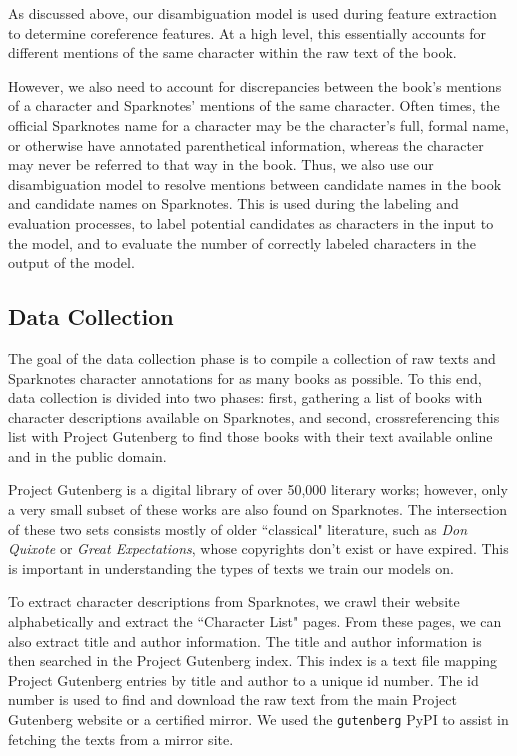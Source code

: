 \documentclass[12pt]{article}
\begin{document}
        As discussed above, our disambiguation model is used during feature extraction to determine coreference
        features.  At a high level, this essentially accounts for different mentions of the same character within the
        raw text of the book.

        However, we also need to account for discrepancies between the book's mentions of a character and Sparknotes'
        mentions of the same character.  Often times, the official Sparknotes name for a character may be the character's
        full, formal name, or otherwise have annotated parenthetical information, whereas the character may never be
        referred to that way in the book.  Thus, we also use our disambiguation model to resolve mentions between candidate
        names in the book and candidate names on Sparknotes.  This is used during the labeling and evaluation processes,
        to label potential candidates as characters in the input to the model, and to evaluate the number of correctly
        labeled characters in the output of the model.


    \subsection{Data Collection}
        The goal of the data collection phase is to compile a collection of raw texts and Sparknotes
        character annotations for as many books as possible.  To this end, data collection is divided into
        two phases: first, gathering a list of books with character descriptions available on Sparknotes,
        and second, crossreferencing this list with Project Gutenberg to find those books with their text
        available online and in the public domain.

        Project Gutenberg is a digital library of over 50,000 literary works; however, only a very small
        subset of these works are also found on Sparknotes.  The intersection of these two sets consists
        mostly of older ``classical" literature, such as \emph{Don Quixote} or \emph{Great Expectations}, 
        whose copyrights don't exist or have expired.  This is important in understanding the types of texts
        we train our models on.

        To extract character descriptions from Sparknotes, we crawl their website alphabetically and extract
        the ``Character List" pages.  From these pages, we can also extract title and author information.  The
        title and author information is then searched in the Project Gutenberg index.  This index is a text
        file mapping Project Gutenberg entries by title and author to a unique id number.  The id number is used
        to find and download the raw text from the main Project Gutenberg website or a certified mirror.  We
        used the \texttt{gutenberg} PyPI to assist in fetching the texts from a mirror site.
\end{document}
